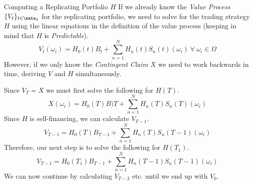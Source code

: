 \documentclass[11pt,a4paper]{article}
\begin{document}
  \begin{remark}{Computing a Replicating Portfolio $H$}
    If we already know the \textit{Value Process} $\{V_t\}_{t\in\nats_0}$ for the replicating portfolio, we need to solve for the trading strategy $H$ using the linear equations in the definition of the value process (keeping in mind that $H$ is \textit{Predictable}).
    \[ V_t(\omega_i)=H_0(t)B_t+\sum_{n=1}^NH_n(t)S_n(t)(\omega_i)\ \forall\ \omega_i\in\Omega \]
    However, if we only know the \textit{Contingent Claim} $X$ we need to work backwards in time, deriving $V$ and $H$ simultaneously.
    \par Since $V_T=X$ we must first solve the following for $H(T)$.
    \[ X(\omega_i)=H_0(T)B)T+\sum_{n=1}^NH_n(T)S_n(T)(\omega_i) \]
    Since $H$ is self-financing, we can calculate $V_{T-1}$.
    \[ V_{T-1}=H_0(T)B_{T-1}+\sum_{n=1}^NH_n(T)S_n(T-1)(\omega_i) \]
    Therefore, our next step is to solve the following for $H(T_1)$.
    \[ V_{T-1}=H_0(T_1)B_{T-1}+\sum_{n=1}^NH_n(T-1)S_n(T-1)(\omega_i) \]
    We can now continue by calculating $V_{T-2}$ etc. until we end up with $V_0$.
  \end{remark}
\end{document}
